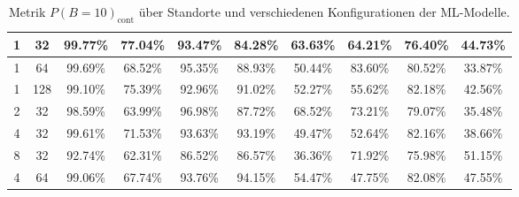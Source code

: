 \begin{table}[h!]
\begin{tabular}{ | c | c | c | c | c | c | c | c | c | c | }
        1 & 32 & 99.77\% & 77.04\% & 93.47\% & 84.28\% & 63.63\% & 64.21\% & 76.40\% & 44.73\% \\\hline
        1 & 64 & 99.69\% & 68.52\% & 95.35\% & 88.93\% & 50.44\% & 83.60\% & 80.52\% & 33.87\% \\\hline
        1 & 128 & 99.10\% & 75.39\% & 92.96\% & 91.02\% & 52.27\% & 55.62\% & 82.18\% & 42.56\% \\\hline
        2 & 32 & 98.59\% & 63.99\% & 96.98\% & 87.72\% & 68.52\% & 73.21\% & 79.07\% & 35.48\% \\\hline
        4 & 32 & 99.61\% & 71.53\% & 93.63\% & 93.19\% & 49.47\% & 52.64\% & 82.16\% & 38.66\% \\\hline
        8 & 32 & 92.74\% & 62.31\% & 86.52\% & 86.57\% & 36.36\% & 71.92\% & 75.98\% & 51.15\% \\\hline
        4 & 64 & 99.06\% & 67.74\% & 93.76\% & 94.15\% & 54.47\% & 47.75\% & 82.08\% & 47.55\% \\\hline
    \end{tabular}
    \caption{Metrik $P(B=10)_{\text{cont}}$ über Standorte und verschiedenen Konfigurationen der ML-Modelle.}
    \label{tab:predictions_by_acc_10_cont}
\end{table}